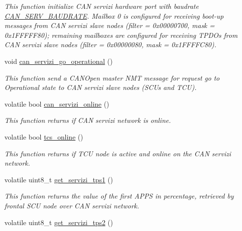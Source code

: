 \begin{DoxyCompactItemize}
\begin{DoxyCompactList}\small\item\em This function initialize C\+AN servizi hardware port with baudrate \mbox{\hyperlink{group___common__defines__group_ga2a5e84dfc7fa972b75e7ddbc6cc52a45}{C\+A\+N\+\_\+\+S\+E\+R\+V\+\_\+\+B\+A\+U\+D\+R\+A\+TE}}. Mailbox 0 is configured for receiving boot-\/up messages from C\+AN servizi slave nodes (filter = 0x00000700, mask = 0x1\+F\+F\+F\+F\+F80); remaining mailboxes are configured for receiving T\+P\+D\+Os from C\+AN servizi slave nodes (filter = 0x00000080, mask = 0x1\+F\+F\+F\+F\+C80). \end{DoxyCompactList}\item 
void \mbox{\hyperlink{group___c_a_n__servizi__group_gad444fb6be3b439dcfbefff66e85efd94}{can\+\_\+servizi\+\_\+go\+\_\+operational}} ()
\begin{DoxyCompactList}\small\item\em This function send a C\+A\+N\+Open master N\+MT message for request \textquotesingle{}go to Operational\textquotesingle{} state to C\+AN servizi slave nodes (S\+C\+Us and T\+CU). \end{DoxyCompactList}\item 
volatile bool \mbox{\hyperlink{group___c_a_n__servizi__group_ga43e9ef52770f760c5751d83b138c7e6b}{can\+\_\+servizi\+\_\+online}} ()
\begin{DoxyCompactList}\small\item\em This function returns if C\+AN servizi network is online. \end{DoxyCompactList}\item 
volatile bool \mbox{\hyperlink{group___c_a_n__servizi__group_ga0c5f72386ae62e3e0b6908efa2fb2b28}{tcs\+\_\+online}} ()
\begin{DoxyCompactList}\small\item\em This function returns if T\+CU node is active and online on the C\+AN servizi network. \end{DoxyCompactList}\item 
volatile uint8\+\_\+t \mbox{\hyperlink{group___c_a_n__servizi__group_gac899876f81f391e2daafcd8b22d2f32e}{get\+\_\+servizi\+\_\+tps1}} ()
\begin{DoxyCompactList}\small\item\em This function returns the value of the first A\+P\+PS in percentage, retrieved by frontal S\+CU node over C\+AN servizi network. \end{DoxyCompactList}\item 
volatile uint8\+\_\+t \mbox{\hyperlink{group___c_a_n__servizi__group_ga431b31efe978864b1a2db0d57a5b572a}{get\+\_\+servizi\+\_\+tps2}} ()

\end{DoxyCompactItemize}
